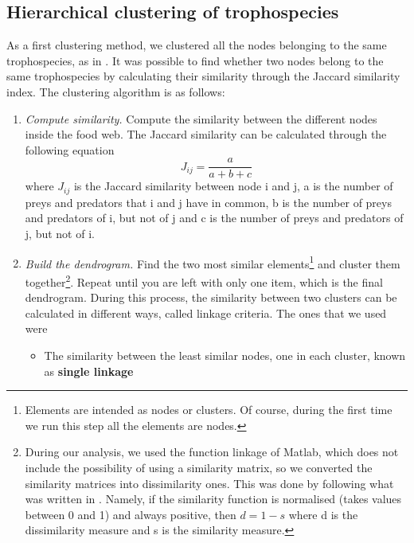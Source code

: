 \documentclass[twocolumn]{article}
\begin{document}
    \subsection*{Hierarchical clustering of trophospecies}
        As a first clustering method, we clustered all the nodes belonging to the same trophospecies, as in \citet{Yodzis1999}. It was possible to find whether two nodes belong to the same trophospecies by calculating their similarity through the Jaccard similarity index. The clustering algorithm is as follows:
        \begin{enumerate}
            \item \emph{Compute similarity.} \smallskip \newline 
                Compute the similarity between the different nodes inside the food web. The Jaccard similarity can be calculated through the following equation \citep{Yodzis1999}
                    \begin{equation}
                        J_{ij}=\frac{a}{a+b+c}
                            \label{eqn:jaccard}
                    \end{equation}
                    where $J_{ij}$ is the Jaccard similarity between node i and j, a is the number of preys and predators that i and j have in common, b is the number of preys and predators of i, but not of j and c is the number of preys and predators of j, but not of i.
            \item \emph{Build the dendrogram.} \smallskip \newline 
                Find the two most similar elements\footnote{Elements are intended as nodes or clusters. Of course, during the first time we run this step all the elements are nodes. } and cluster them together\footnote{During our analysis, we used the function linkage of Matlab, which does not include the possibility of using a similarity matrix, so we converted the similarity matrices into dissimilarity ones. This was done by following what was written in \citet{VonLuxburg2004}. Namely, if the similarity function is normalised (takes values between 0 and 1) and always positive, then $d=1-s$ where d is the dissimilarity measure and s is the similarity measure.}. Repeat until you are left with only one item, which is the final dendrogram. During this process, the similarity between two clusters can be calculated in different ways, called linkage criteria. The ones that we used were
                \begin{itemize}
                    \item The similarity between the least similar nodes, one in each cluster, known as \textbf{single linkage} \citep{Frigui2008}

\end{itemize}
\end{enumerate}
\end{document}
